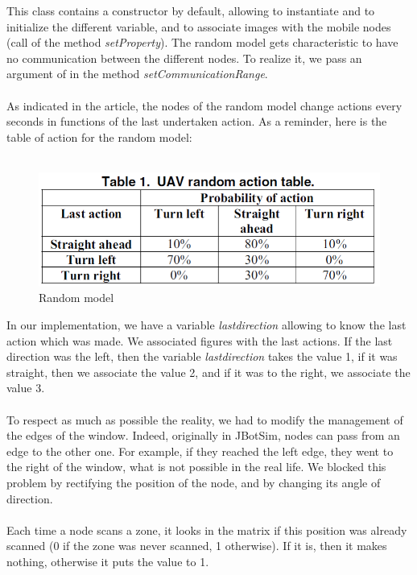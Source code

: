 This class contains a constructor by default, allowing to instantiate and to initialize the different variable, and to associate images with the mobile nodes (call of the method \textit{setProperty}). The random model gets characteristic to have no communication between the different nodes. To realize it, we pass an argument of  in the method \textit{setCommunicationRange}.\\\\

As indicated in the article, the nodes of the random model change actions every seconds in functions of the last undertaken action. As a reminder, here is the table of action for the random model:\\\\

\begin{figure}[h]
\center
\includegraphics{../images/table_random.png}
\caption{Random model}
\end{figure}

In our implementation, we have a variable \textit{lastdirection} allowing to know the last action which was made. We associated figures with the last actions. If the last direction was the left, then the variable \textit {lastdirection} takes the value 1, if it was straight, then we associate the value 2, and if it was to the right, we associate the value 3.\\\\

To respect as much as possible the reality, we had to modify the management of the edges of the window. Indeed, originally in JBotSim, nodes can pass from an edge to the other one. For example, if they reached the left edge, they went to the right of the window, what is not possible in the real life. We blocked this problem by rectifying the position of the node, and by changing its angle of direction.\\\\

Each time a node scans a zone, it looks in the matrix if this position was already scanned (0 if the zone was never scanned, 1 otherwise). If it is, then it makes nothing, otherwise it puts the value to 1.\\\\

